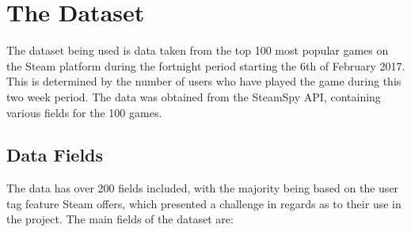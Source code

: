 \documentclass[dataset.tex]{subfiles}
\begin{document}
\section{The Dataset} %
\label{sec:dataset}
The dataset being used is data taken from the top 100 most popular games on the
Steam platform during the fortnight period starting the 6th of February 2017.
This is determined by the number of users who have played the game during this
two week period. The data was obtained from the SteamSpy API, containing various
fields for the 100 games.

\subsection{Data Fields} %
\label{sub:data_fields}
The data has over 200 fields included, with the majority being based on the user
tag feature Steam offers, which presented a challenge in regards as to their use
in the project. The main fields of the dataset are:
\end{document}
